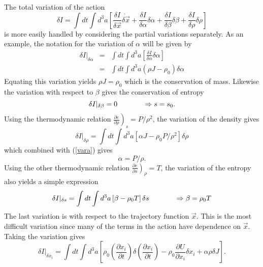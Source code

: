 The total variation of the action
\begin{equation}
\delta I = \int dt \int d^3a \left[ \frac{\delta I}{\delta \vec x}\dot{\delta \vec x} + \frac{\delta I}{\delta \alpha}{\delta \alpha} + \frac{\delta I}{\delta \beta}{\delta \beta} + \frac{\delta I}{\delta \rho}{\delta \rho} \right]
\end{equation}
is more easily handled by considering the partial variations separately.  As an example, the notation for the variation of $\alpha$ will be given by
\begin{eqnarray}\label{vara}
\delta I \vert_{\delta \alpha} & = & \int dt \int d^3a \left[ \frac{\delta I}{\delta \alpha} {\delta \alpha} \right] \nonumber \\
& = & \int dt \int d^3a (\rho J  - \rho_0) \delta \alpha
\end{eqnarray}
Equating this variation yields $\rho J = \rho_0$ which is the conservation of mass.
Likewise the variation with respect to $\beta$ gives the conservation of entropy
\begin{equation}
\delta I \vert_{\delta \beta} = 0 \hspace{0.5 in} \Rightarrow s = s_0.
\end{equation} 
Using the thermodynamic relation $\left. \frac{\partial e}{\partial \rho} \right) _{s} = P/{\rho}^2$, the variation of the density gives
\begin{equation}
\delta I \vert_{\delta \rho} = \int dt \int d^3a \left[ \alpha J - \rho_0 P/{\rho}^2 \right] \delta \rho
\end{equation}
which combined with (\ref{vara}) gives
\begin{equation}
\alpha = P/{\rho}.
\end{equation}
Using the other thermodynamic relation $\left. \frac{\partial e}{\partial s} \right)_{\rho} = T$, the variation of the entropy also yields a simple expression
\begin{equation}
\delta I \vert_{\delta s} = \int dt \int d^3a \left[ \beta - \rho_0 T \right] \delta s \hspace{0.5 in} \Rightarrow \beta = \rho_0 T
\end{equation}
The last variation is with respect to the trajectory function ${\vec x}$.  This is the most difficult variation since many of the terms in the action have dependence on ${\vec x}$.  Taking the variation gives
\begin{equation}
\delta I \vert_{\delta x_i} = \int dt \int d^3a \left[ \rho_0 \left(\frac{\partial x_i}{\partial t}\right)\delta \left(\frac{\partial x_i}{\partial t} \right) - \rho_0 \frac{\partial U}{\partial x_i} \delta {x_i} + \alpha \rho \delta J \right].
\end{equation}
